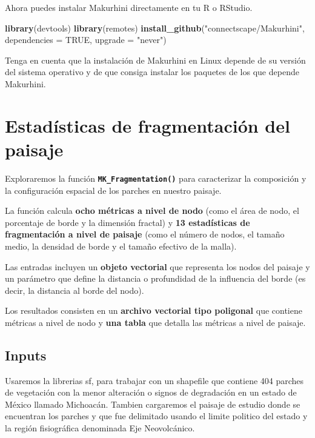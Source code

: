 \documentclass[
]{book}
\newenvironment{Shaded}{\begin{snugshade}}{\end{snugshade}}
\newcommand{\AttributeTok}[1]{\textcolor[rgb]{0.13,0.29,0.53}{#1}}
\newcommand{\ConstantTok}[1]{\textcolor[rgb]{0.56,0.35,0.01}{#1}}
\newcommand{\FunctionTok}[1]{\textcolor[rgb]{0.13,0.29,0.53}{\textbf{#1}}}
\newcommand{\NormalTok}[1]{#1}
\newcommand{\StringTok}[1]{\textcolor[rgb]{0.31,0.60,0.02}{#1}}
\begin{document}
Ahora puedes instalar Makurhini directamente en tu R o RStudio.

\begin{Shaded}
\begin{Highlighting}[]
\FunctionTok{library}\NormalTok{(devtools) }
\FunctionTok{library}\NormalTok{(remotes) }
\FunctionTok{install\_github}\NormalTok{(}\StringTok{"connectscape/Makurhini"}\NormalTok{, }\AttributeTok{dependencies =} \ConstantTok{TRUE}\NormalTok{, }\AttributeTok{upgrade =} \StringTok{"never"}\NormalTok{) }
\end{Highlighting}
\end{Shaded}

Tenga en cuenta que la instalación de Makurhini en Linux depende de su
versión del sistema operativo y de que consiga instalar los paquetes de
los que depende Makurhini.

\chapter{Estadísticas de fragmentación del paisaje}\label{estaduxedsticas-de-fragmentaciuxf3n-del-paisaje}

Exploraremos la función \textbf{\texttt{MK\_Fragmentation()}} para caracterizar la composición y la configuración espacial de los parches en nuestro paisaje.

La función calcula \textbf{ocho métricas a nivel de nodo} (como el área de nodo, el porcentaje de borde y la dimensión fractal) y \textbf{13 estadísticas de fragmentación a nivel de paisaje} (como el número de nodos, el tamaño medio, la densidad de borde y el tamaño efectivo de la malla).

Las entradas incluyen un \textbf{objeto vectorial} que representa los nodos del paisaje y un parámetro que define la distancia o profundidad de la influencia del borde (es decir, la distancia al borde del nodo).

Los resultados consisten en un \textbf{archivo vectorial tipo poligonal} que contiene métricas a nivel de nodo y \textbf{una tabla} que detalla las métricas a nivel de paisaje.

\section{Inputs}\label{inputs}

Usaremos la librerias sf, para trabajar con un shapefile que contiene 404 parches de vegetación con la menor alteración o signos de degradación en un estado de México llamado Michoacán. Tambien cargaremos el paisaje de estudio donde se encuentran los parches y que fue delimitado usando el limite politico del estado y la región fisiográfica denominada Eje Neovolcánico.
\end{document}
